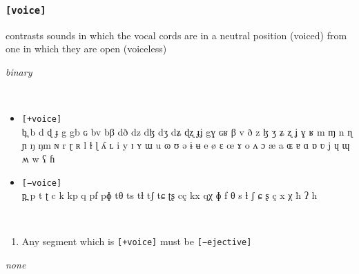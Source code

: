\documentclass[10pt,letterpaper]{article}
\begin{document}
\subsubsection{\texttt{[voice]}}
\label{ssub:feature_voice}
\begin{samepage}
\begin{description}
\itemsep1pt \parskip0pt  
\item[Descritpion] contrasts sounds in which the vocal cords are in a neutral position (voiced) from one in which they are open (voiceless)
\item[Type] \emph{binary}
\item[Examples]\
  \begin{itemize}
    \item \texttt{[+voice]}\\
    b̪ b d ɖ ɟ g gb ɢ bv bβ dð dz dɮ dʒ dʑ ɖʐ ɟʝ gɣ ɢʁ β v ð z ɮ ʒ ʑ ʐ ʝ ɣ ʁ m ɱ n ɳ ɲ ŋ ŋm ɴ r ɽ ʀ l ɫ ɭ ʎ ʟ i y ɪ ʏ ɯ u ɷ ʊ ə ɨ ʉ e ø ɛ œ ɤ o ʌ ɔ æ a ɶ ɐ ɑ ɒ ʋ j ɥ ɰ ʍ w ʕ ɦ 
    \item \texttt{[−voice]}\\
    p̪ p t ʈ c k kp q pf pɸ tθ ts tɬ tʃ tɕ ʈʂ cç kx qχ ɸ f θ s ɬ ʃ ɕ ʂ ç x χ ħ ʔ h 
  \end{itemize}
\item[Constraints]\
  \begin{enumerate}
    \item Any segment which is \texttt{[+voice]} must be \texttt{[−ejective]}
  \end{enumerate} 
\item[Resctrictions] \emph{none}
\end{description}
\end{samepage}
\end{document}
